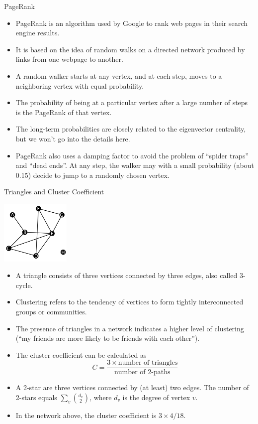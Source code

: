\documentclass[9pt,handout]{beamer}
\let\olditem\item
\renewcommand{\item}{\olditem\vfill}
\begin{document}
\begin{frame}{PageRank}
  \begin{itemize}
    \item PageRank is an algorithm used by Google to rank web pages in their search engine results.
    \item It is based on the idea of random walks on a directed network produced by links from one webpage to another.
    \item A random walker starts at any vertex, and at each step, moves to a neighboring vertex with equal probability.
    \item The probability of being at a particular vertex after a large number of steps is the PageRank of that vertex.
    \item The long-term probabilities are closely related to the eigenvector centrality, but we won't go into the details here. 
    \item PageRank also uses a damping factor to avoid the problem of ``spider traps'' and ``dead ends''. At any step, the walker may with a small probability (about 0.15) decide to jump to a randomly chosen vertex.
  \end{itemize}
\end{frame}


\begin{frame}{Triangles and Cluster Coefficient}
  \begin{center}
    \includegraphics[width=0.25\textwidth]{week_02_lecture_img_01}
  \end{center}    
  \begin{itemize}
    \item A triangle consists of three vertices connected by three edges, also called 3-cycle.
    \item Clustering refers to the tendency of vertices to form tightly interconnected groups or communities.
    \item The presence of triangles in a network indicates a higher level of clustering (``my friends are more likely to be friends with each other'').
    \item The cluster coefficient can be calculated as
    \[
    C = \frac{{3 \times \text{{number of triangles}}}}{{\text{{number of 2-paths}}}}
    \]
    \item A 2-star are three vertices connected by (at least) two edges. The number of 2-stars equals $\sum_v {d_v \choose 2}$, where $d_v$ is the degree of vertex $v$.  
    \item In the network above, the cluster coefficient is $3\times4/18$.
  \end{itemize}
\end{frame}
\end{document}
